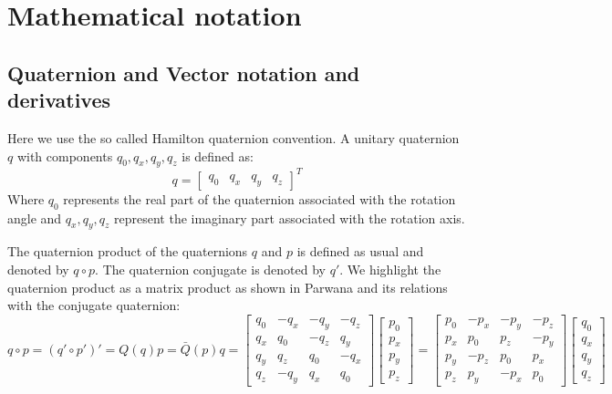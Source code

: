 
\section{Mathematical notation}
\subsection{Quaternion and Vector notation and derivatives}
Here we use the so called Hamilton quaternion convention. A unitary quaternion $q$ with components $q_0, q_x, q_y, q_z$ is defined as:
\begin{equation}
 q = 
 \left[ \begin{matrix}
 q_0 & q_x & q_y & q_z
 \end{matrix}  \right]^T
\end{equation}
Where $q_0$ represents the real part of the quaternion associated with the rotation angle and $q_x, q_y, q_z$ represent the imaginary part associated with the rotation axis.

The quaternion product of the quaternions $q$ and $p$ is defined as usual and denoted by $q \circ p$. The quaternion conjugate is denoted by $q'$. We highlight the quaternion product as a matrix product as shown in Parwana \cite{parwana2017quaternion} and its relations with the conjugate quaternion:
\begin{equation}
q \circ p = (q' \circ p')' = Q(q) p = \bar{Q}(p) q 
= 
\left[\begin{matrix}
  q_0 & -q_x & -q_y & -q_z \\
  q_x & q_0 & -q_z & q_y \\
  q_y & q_z & q_0 & -q_x \\
  q_z & -q_y & q_x & q_0 
\end{matrix}\right]
 \left[ \begin{matrix}
p_0 \\ p_x \\ p_y \\ p_z
\end{matrix}  \right]
=
\left[\begin{matrix}
p_0 & -p_x & -p_y & -p_z \\
p_x & p_0 & p_z & -p_y \\
p_y & -p_z & p_0 & p_x \\
p_z & p_y & -p_x & p_0 
\end{matrix}\right]
\left[ \begin{matrix}
q_0 \\ q_x \\ q_y \\ q_z
\end{matrix}  \right]
\end{equation}

